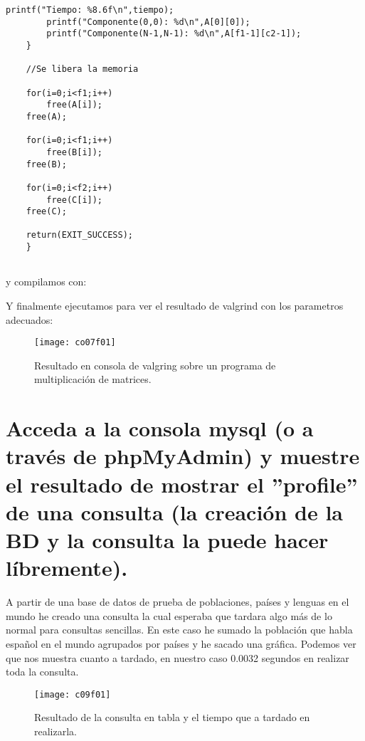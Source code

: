 \begin{lstlisting}[style=C]
		printf("Tiempo: %8.6f\n",tiempo);
		printf("Componente(0,0): %d\n",A[0][0]);
		printf("Componente(N-1,N-1): %d\n",A[f1-1][c2-1]);
	}

	//Se libera la memoria
	
	for(i=0;i<f1;i++)
		free(A[i]);
	free(A);
	
	for(i=0;i<f1;i++)
		free(B[i]);
	free(B);
	
	for(i=0;i<f2;i++)
		free(C[i]);
	free(C);
	
	return(EXIT_SUCCESS);
	}


\end{lstlisting}


y compilamos con:
	
Y finalmente ejecutamos para ver el resultado de valgrind con los parametros adecuados:

\begin{figure}[H]
\centering
\texttt{[image: co07f01]}
\caption{Resultado en consola de valgring sobre un programa de multiplicación de matrices.}
\label{fig:co07f01}
\end{figure}



\section{Acceda a la consola mysql (o a través de phpMyAdmin) y muestre el resultado de mostrar el ”profile” de una consulta (la creación de	la BD y la consulta la puede hacer líbremente).}

A partir de una base de datos de prueba de poblaciones, países y lenguas en el mundo he creado una consulta la cual esperaba que tardara algo más de lo normal para consultas sencillas. En este caso he sumado la población que habla español en el mundo agrupados por países y he sacado una gráfica. Podemos ver que nos muestra cuanto a tardado, en nuestro caso 0.0032 segundos en realizar toda la consulta.


\begin{figure}[H]
\centering
\texttt{[image: c09f01]}
\caption{Resultado de la consulta en tabla y el tiempo que a tardado en realizarla.}
\label{fig:c09f01}
\end{figure}

